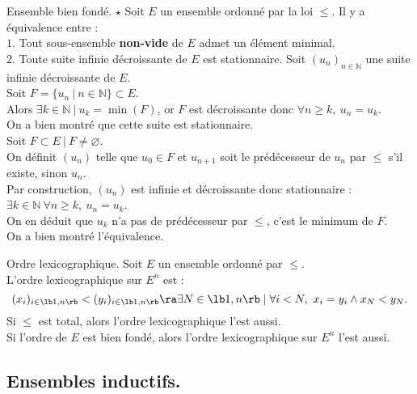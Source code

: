 \documentclass[french, 11pt]{article}
\begin{document}
\begin{prop}{Ensemble bien fondé. $\star$}{}
    Soit $E$ un ensemble ordonné par la loi $\leq$. Il y a équivalence entre :\\
    \hspace*{2em}$1.$ Tout sous-ensemble \textbf{non-vide} de $E$ admet un élément minimal.\\
    \hspace*{2em}$2.$ Toute suite infinie décroissante de $E$ est stationnaire.
    \tcblower
    \fbox{$\ra$} Soit $(u_n)_{n\in\mathbb{N}}$ une suite infinie décroissante de $E$.\\
    Soit $F=\{u_n ~ | ~ n \in \mathbb{N}\}\subset E$.\\
    Alors $\exists k \in \mathbb{N} ~ | ~ u_k = \min(F)$, or $F$ est décroissante donc $\forall n \geq k, ~ u_n = u_k$.\\
    On a bien montré que cette suite est stationnaire.\\[0.2cm]
    \fbox{$\la$} Soit $F\subset E ~ | ~ F \neq \varnothing$.\\
    On définit $(u_n)$ telle que $u_0 \in F$ et $u_{n+1}$ soit le prédécesseur de $u_n$ par $\leq$ s'il existe, sinon $u_n$.\\
    Par construction, $(u_n)$ est infinie et décroissante donc stationnaire : $\exists k \in \mathbb{N} ~ \forall n \geq k, ~ u_n = u_k$.\\
    On en déduit que $u_k$ n'a pas de prédécesseur par $\leq$, c'est le minimum de $F$.\\
    On a bien montré l'équivalence.
\end{prop}

\begin{prop}{Ordre lexicographique.}{}
    Soit $E$ un ensemble ordonné par $\leq$.\\
    L'ordre lexicographique sur $E^n$ est :
    \begin{equation*}
        (x_i)_{i\in\lb1,n\rb} < (y_i)_{i\in\lb1,n\rb} \ra \exists N \in \lb1,n\rb \mid \forall i < N, ~ x_i = y_i \land x_N < y_N.
    \end{equation*}
    Si $\leq$ est total, alors l'ordre lexicographique l'est aussi.\\
    Si l'ordre de $E$ est bien fondé, alors l'ordre lexicographique sur $E^n$ l'est aussi.
\end{prop}

\subsection{Ensembles inductifs.}{}
\end{document}
